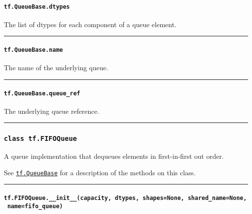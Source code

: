 \paragraph{\texorpdfstring{\texttt{tf.QueueBase.dtypes}
}{tf.QueueBase.dtypes }}\label{tf.queuebase.dtypes}

The list of dtypes for each component of a queue element.

\begin{center}\rule{0.5\linewidth}{\linethickness}\end{center}

\paragraph{\texorpdfstring{\texttt{tf.QueueBase.name}
}{tf.QueueBase.name }}\label{tf.queuebase.name}

The name of the underlying queue.

\begin{center}\rule{0.5\linewidth}{\linethickness}\end{center}

\paragraph{\texorpdfstring{\texttt{tf.QueueBase.queue\_ref}
}{tf.QueueBase.queue\_ref }}\label{tf.queuebase.queueux5fref}

The underlying queue reference.

\begin{center}\rule{0.5\linewidth}{\linethickness}\end{center}

\subsubsection{\texorpdfstring{\texttt{class\ tf.FIFOQueue}
}{class tf.FIFOQueue }}\label{class-tf.fifoqueue}

A queue implementation that dequeues elements in first-in-first out
order.

See \protect\hyperlink{QueueBase}{\texttt{tf.QueueBase}} for a
description of the methods on this class.

\begin{center}\rule{0.5\linewidth}{\linethickness}\end{center}

\paragraph{\texorpdfstring{\texttt{tf.FIFOQueue.\_\_init\_\_(capacity,\ dtypes,\ shapes=None,\ shared\_name=None,\ name=\textquotesingle{}fifo\_queue\textquotesingle{})}
}{tf.FIFOQueue.\_\_init\_\_(capacity, dtypes, shapes=None, shared\_name=None, name='fifo\_queue') }}\label{tf.fifoqueue.ux5fux5finitux5fux5fcapacity-dtypes-shapesnone-sharedux5fnamenone-namefifoux5fqueue}

